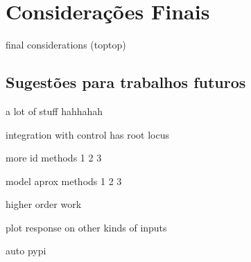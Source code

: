 \chapter{Considerações Finais}

final considerations (toptop)

\section{Sugestões para trabalhos futuros}

a lot of stuff hahhahah

integration with control has root locus

more id methods
1
2
3

model aprox methods
1
2
3


higher order work

plot response on other kinds of inputs

auto pypi

